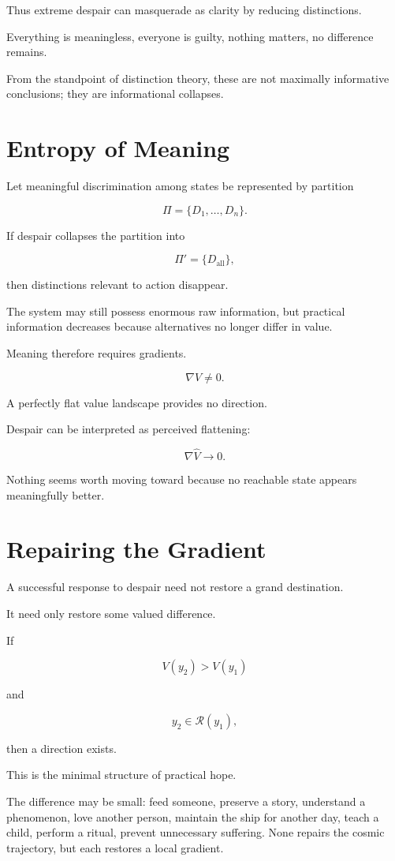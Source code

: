 \documentclass[11pt,oneside]{book}
\theoremstyle{definition}
\theoremstyle{remark}
\newcommand{\R}{\mathcal{R}}
\begin{document}
Thus extreme despair can masquerade as clarity by reducing distinctions.

Everything is meaningless, everyone is guilty, nothing matters, no difference remains.

From the standpoint of distinction theory, these are not maximally informative conclusions; they are informational collapses.

\section{Entropy of Meaning}

Let meaningful discrimination among states be represented by partition

\[
\Pi
=
\{D_1,\ldots,D_n\}.
\]

If despair collapses the partition into

\[
\Pi'
=
\{D_{\mathrm{all}}\},
\]

then distinctions relevant to action disappear.

The system may still possess enormous raw information, but practical information decreases because alternatives no longer differ in value.

Meaning therefore requires gradients.

\[
\nabla V\neq0.
\]

A perfectly flat value landscape provides no direction.

Despair can be interpreted as perceived flattening:

\[
\nabla \widehat V\rightarrow0.
\]

Nothing seems worth moving toward because no reachable state appears meaningfully better.

\section{Repairing the Gradient}

A successful response to despair need not restore a grand destination.

It need only restore some valued difference.

If

\[
V(y_2)>V(y_1)
\]

and

\[
y_2\in\R(y_1),
\]

then a direction exists.

This is the minimal structure of practical hope.

The difference may be small: feed someone, preserve a story, understand a phenomenon, love another person, maintain the ship for another day, teach a child, perform a ritual, prevent unnecessary suffering. None repairs the cosmic trajectory, but each restores a local gradient.
\end{document}
